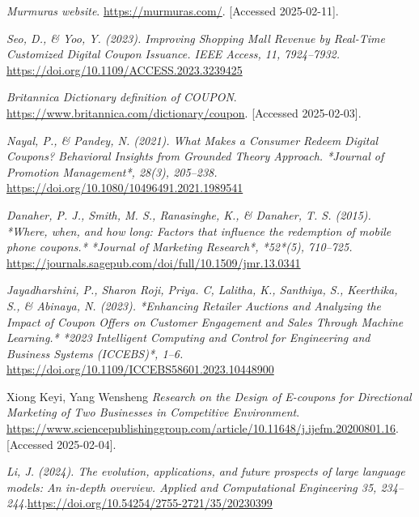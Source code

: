 \documentclass[licencjacka,en]{pracamgr}
\begin{document}
\begin{thebibliography}{99}

    \raggedright

    \textit{Murmuras website}.
    \url{https://murmuras.com/}.
    [Accessed 2025-02-11].

    \textit{Seo, D., \& Yoo, Y. (2023). Improving Shopping Mall Revenue by Real-Time Customized Digital Coupon Issuance. IEEE Access, 11, 7924–7932.}
    \url{https://doi.org/10.1109/ACCESS.2023.3239425}

    \textit{Britannica Dictionary definition of COUPON}.
    \url{https://www.britannica.com/dictionary/coupon}.
    [Accessed 2025-02-03].

    \textit{Nayal, P., \& Pandey, N. (2021). What Makes a Consumer Redeem Digital Coupons? Behavioral Insights from Grounded Theory Approach. *Journal of Promotion Management*, 28(3), 205–238.}
    \url{https://doi.org/10.1080/10496491.2021.1989541}

    \textit{Danaher, P. J., Smith, M. S., Ranasinghe, K., \& Danaher, T. S. (2015). *Where, when, and how long: Factors that influence the redemption of mobile phone coupons.* *Journal of Marketing Research*, *52*(5), 710--725.}
    \url{https://journals.sagepub.com/doi/full/10.1509/jmr.13.0341}

    \textit{Jayadharshini, P., Sharon Roji, Priya. C, Lalitha, K., Santhiya, S., Keerthika, S., \& Abinaya, N. (2023). *Enhancing Retailer Auctions and Analyzing the Impact of Coupon Offers on Customer Engagement and Sales Through Machine Learning.* *2023 Intelligent Computing and Control for Engineering and Business Systems (ICCEBS)*, 1–6. }
    \url{https://doi.org/10.1109/ICCEBS58601.2023.10448900}

    Xiong Keyi, Yang Wensheng
    \textit{Research on the Design of E-coupons for Directional Marketing of Two Businesses in Competitive Environment}.
    \url{https://www.sciencepublishinggroup.com/article/10.11648/j.ijefm.20200801.16}.
    [Accessed 2025-02-04].

    \textit{Li, J. (2024). The evolution, applications, and future prospects of large language models: An in-depth overview. Applied and Computational Engineering 35, 234–244.}\url{https://doi.org/10.54254/2755-2721/35/20230399}


\end{thebibliography}
\end{document}
